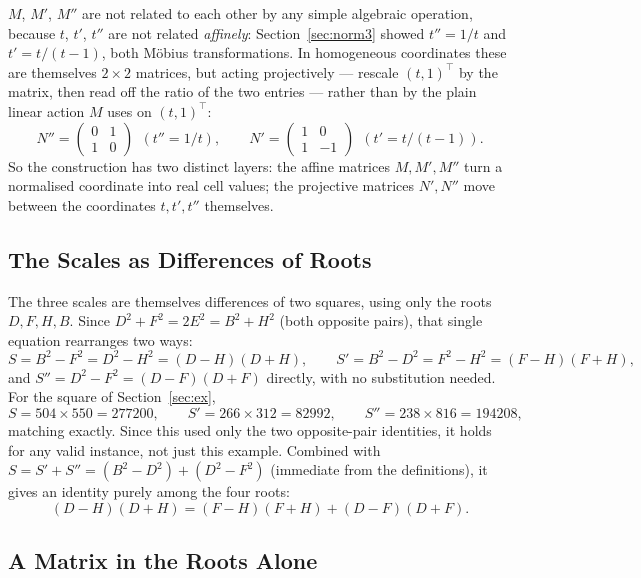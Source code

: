 \documentclass[12pt]{article}
\theoremstyle{remark}
\begin{document}
$M$, $M'$, $M''$ are not related to each other by any simple algebraic
operation, because $t$, $t'$, $t''$ are not related \emph{affinely}:
Section~\ref{sec:norm3} showed $t'' = 1/t$ and $t' = t/(t-1)$, both
M\"obius transformations. In homogeneous coordinates these are
themselves $2\times2$ matrices, but acting projectively --- rescale
$(t,1)^\top$ by the matrix, then read off the ratio of the two
entries --- rather than by the plain linear action $M$ uses on
$(t,1)^\top$:
\[
N'' = \begin{pmatrix} 0 & 1 \\ 1 & 0 \end{pmatrix}
\ \ (t'' = 1/t), \qquad
N' = \begin{pmatrix} 1 & 0 \\ 1 & -1 \end{pmatrix}
\ \ (t' = t/(t-1)) .
\]
So the construction has two distinct layers: the affine matrices
$M, M', M''$ turn a normalised coordinate into real cell values; the
projective matrices $N', N''$ move between the coordinates $t, t',
t''$ themselves.

\subsection{The Scales as Differences of Roots}

The three scales are themselves differences of two squares, using
only the roots $D, F, H, B$. Since $D^2 + F^2 = 2E^2 = B^2 + H^2$
(both opposite pairs), that single equation rearranges two ways:
\[
S = B^2 - F^2 = D^2 - H^2 = (D-H)(D+H) , \qquad
S' = B^2 - D^2 = F^2 - H^2 = (F-H)(F+H) ,
\]
and $S'' = D^2 - F^2 = (D-F)(D+F)$ directly, with no substitution
needed. For the square of Section~\ref{sec:ex},
\[
S = 504 \times 550 = 277200, \qquad
S' = 266 \times 312 = 82992, \qquad
S'' = 238 \times 816 = 194208 ,
\]
matching exactly. Since this used only the two opposite-pair
identities, it holds for any valid instance, not just this example.
Combined with $S = S' + S'' = (B^2-D^2) + (D^2-F^2)$ (immediate from
the definitions), it gives an identity purely among the four roots:
\[
(D-H)(D+H) = (F-H)(F+H) + (D-F)(D+F) .
\]

\subsection{A Matrix in the Roots Alone}
\end{document}
